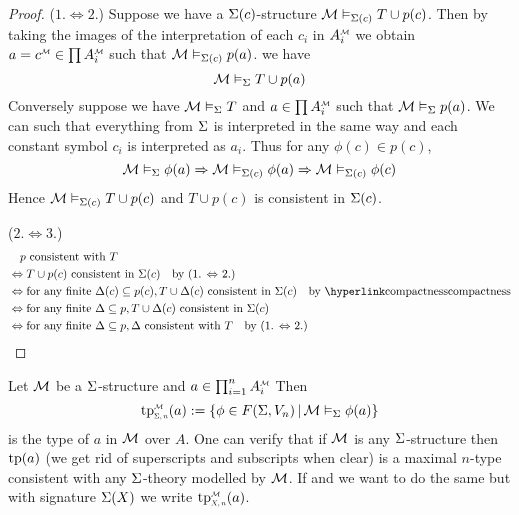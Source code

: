 \begin{proof}
    ($1. \iff 2.$) 
        Suppose we have a $\Sigma(c)$-structure 
        $\mathcal{M} \vDash_{\Sigma(c)} T \cup p(c)$.
        Then by taking the images of the interpretation of each $c_i$ in 
        $\mmintp{A_i}$
        we obtain $a = \modintp{\MM}{c} \in \prod \mmintp{A_i}$ such that 
        $\mathcal{M} \vDash_{\Sigma(c)} p(a)$.
         we have
        \[\mathcal{M} \vDash_{\Sigma} T \cup p(a)\]
        Conversely suppose we have $\mathcal{M} \vDash_{\Sigma} T$ and 
        $a \in \prod \mmintp{A_i}$ such that $\mathcal{M} \vDash_{\Sigma} p(a)$.
        We can  such that 
        everything from $\Sigma$ is interpreted in the same way 
        and each constant symbol $c_i$ is interpreted as $a_i$.
        Thus for any $\phi(c) \in p(c)$,
        \[\mathcal{M} \vDash_{\Sigma} \phi(a) \Rightarrow \mathcal{M} \vDash_{\Sigma(c)} \phi(a)
        \Rightarrow \mathcal{M} \vDash_{\Sigma(c)} \phi(c)\]
        Hence $\mathcal{M} \vDash_{\Sigma(c)} T \cup p(c)$ 
        and $T \cup p(c)$ is consistent in $\Sigma(c)$.

    ($2. \iff 3.$) 
    \begin{align*}
        &\quad p \text{ consistent with } T \\
        &\iff T \cup p(c) \text{ consistent in } \Si(c) 
        \quad \text{by (1. $\iff$ 2.)}\\
        &\iff \text{for any finite } \De(c) \subs p(c), 
        T \cup \De(c) \text{ consistent in } \Si(c) 
        \quad \text{by \linkto{compactness}{compactness}}\\
        &\iff \text{for any finite } \De \subs p, 
        T \cup \De(c) \text{ consistent in } \Si(c) \\
        &\iff \text{for any finite } \De \subs p, 
        \De \text{ consistent with } T
        \quad \text{by (1. $\iff$ 2.)}
    \end{align*}
\end{proof}

\begin{dfn}
    Let $\mathcal{M}$ be a $\Sigma$-structure and $a \in \prod_{i=1}^n \mmintp{A_i}$
    Then 
    \[\subintp{\Si,n}{\MM}{\tp}(a) := 
    \set{\phi \in F(\Si,V_n) \st \MM \model{\Si} \phi(a)}\]
    is the type of $a$ in $\mathcal{M}$ over $A$.
    One can verify that if $\mathcal{M}$ is any $\Sigma$-structure then 
    $\operatorname{tp}(a)$ (we get rid of superscripts and subscripts when clear) 
    is a maximal $n$-type consistent with any $\Sigma$-theory modelled by $\mathcal{M}$.
    If  
    and we want to do the same but with signature $\Sigma(X)$
    we write $\subintp{X,n}{\MM}{\tp}(a)$.
\end{dfn}

